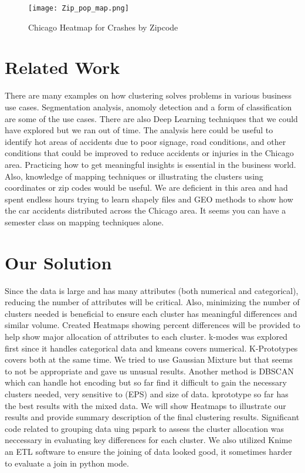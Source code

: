 \documentclass[conference]{IEEEtran}
\begin{document}
\begin{figure}[!h]
	\texttt{[image: Zip\_pop\_map.png]}
	\caption{Chicago Heatmap for Crashes by Zipcode}
	\label{fig: Chicago Heatmap for Crashes by Zipcode}
 \end{figure}

\section{Related Work}
There are many examples on how clustering solves problems in various business use cases.  Segmentation analysis, anomoly detection and a form of classification are some of the use cases. There are also Deep Learning techniques that we could have explored but we ran out of time.  The analysis here could be useful to identify hot areas of accidents due to poor signage, road conditions, and other conditions that could be improved to reduce accidents or injuries in the Chicago area.  Practicing how to get meaningful insights is essential in the business world.  Also, knowledge of mapping techniques or illustrating the clusters using coordinates or zip codes would be useful.  We are deficient in this area and had spent endless hours trying to learn shapely files and GEO methods to show how the car accidents distributed across the Chicago area.  It seems you can have a semester class on mapping techniques alone.


\section{Our Solution}
Since the data is large and has many attributes (both numerical and categorical), reducing the number of attributes will be critical.  Also, minimizing the number of clusters needed is beneficial to ensure each cluster has meaningful differences and similar volume. Created Heatmaps showing percent differences will be provided to help show major allocation of attributes to each cluster. k-modes was explored first since it handles categorical data and kmeans covers numerical.  K-Prototypes covers both at the same time.  We tried to use Gaussian Mixture but that seems to not be appropriate and gave us unusual results.  Another method is DBSCAN which can handle hot encoding but so far find it difficult to gain the necessary clusters needed, very sensitive to (EPS) and size of data.  kprototype so far has the best results with the mixed data.  We will show Heatmaps to illustrate our results and provide summary description of the final clustering results.  Significant code related to grouping data uing pspark to assess the cluster allocation was neccessary in evaluating key differences for each cluster.  We also utilized Knime an ETL software to ensure the joining of data looked good,  it sometimes harder to evaluate a join in python mode.
\end{document}
